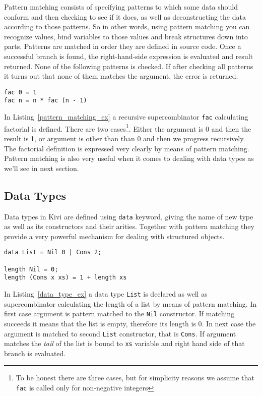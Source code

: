 \documentclass[a4paper]{report}
\begin{document}
Pattern matching consists of specifying patterns to which some data should
conform and then checking to see if it does, as well as deconstructing the data
according to those patterns. So in other words, using pattern matching you can
recognize values, bind variables to those values and break structures down into
parts.
Patterns are matched in order they are defined in source code. Once a
successful branch is found, the right-hand-side expression is evaluated and
result returned. None of the following patterns is checked. If after checking
all patterns it turns out that none of them matches the argument, the error is
returned.

\begin{lstlisting}[label=pattern_matching_ex,caption={Factorial using pattern matching.}]
fac 0 = 1
fac n = n * fac (n - 1)
\end{lstlisting}

In Listing~\ref{pattern_matching_ex} a recursive supercombinator \texttt{fac}
calculating factorial is defined. There are two cases\footnote{To be honest
there are three cases, but for simplicity reasons we assume that
\texttt{fac} is called only for non-negative integers}. Either the
argument is 0 and then the result is 1, or argument is other than than 0 and
then we progress recursively. The factorial definition is expressed very
clearly by means of pattern matching.
Pattern matching is also very useful when it comes to dealing with data
types as we'll see in next section.

\subsection{Data Types}
Data types in Kivi are defined using \texttt{data} keyword, giving the name of
new type as well as its constructors and their arities. Together with pattern matching they
provide a very powerful mechanism for dealing with structured objects.

\begin{lstlisting}[label=data_type_ex,caption={Calculating length of list.}]
data List = Nil 0 | Cons 2;

length Nil = 0;
length (Cons x xs) = 1 + length xs
\end{lstlisting}

In Listing~\ref{data_type_ex} a data type \texttt{List} is declared as well as
supercombinator calculating the length of a list by means of pattern matching.
In first case argument is pattern matched to the \texttt{Nil} constructor. If
matching succeeds it means that the list is empty, therefore its length is 0.
In next case the argument is matched to second \texttt{List} constructor, that
is \texttt{Cons}. If argument matches the \textit{tail} of the list is bound to
\texttt{xs} variable and right hand side of that branch is evaluated.
\end{document}
